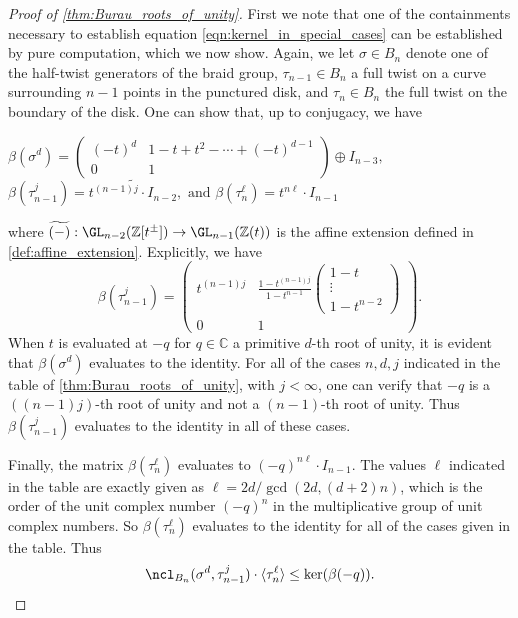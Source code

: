 \documentclass{amsart}
\begin{document}
    \begin{proof}[Proof of \cref{thm:Burau_roots_of_unity}]
        First we note that one of the containments necessary to establish equation \eqref{eqn:kernel_in_special_cases} can be established by pure computation, which we now show. Again, we let $\sigma \in B_n$ denote one of the half-twist generators of the braid group, $\tau_{n-1} \in B_n$ a full twist on a curve surrounding $n-1$ points in the punctured disk, and $\tau_n \in B_n$ the full twist on the boundary of the disk. One can show that, up to conjugacy, we have
        \begin{center}
            $\beta(\sigma^d) = \begin{pmatrix}
                (-t)^d & 1-t+t^2-\dotsb + (-t)^{d-1} \\ 0 & 1
            \end{pmatrix} \oplus I_{n-3},$ \\
            $\beta(\tau_{n-1}^j) = \widetilde{t^{(n-1)j} \cdot I_{n-2}}, \text{ and } 
            \beta(\tau_n^\ell) = t^{n\ell} \cdot I_{n-1}$
        \end{center}
        where $\widetilde{(-)}:\GL_{n-2}(\mathbb Z[t^\pm]) \to \GL_{n-1}(\mathbb Z(t))$ is the affine extension defined in \cref{def:affine_extension}. Explicitly, we have
        \begin{equation*}
            \beta(\tau_{n-1}^j) = \left( \begin{array}{c|c}
                 t^{(n-1)j} & \frac{1-t^{(n-1)j}}{1-t^{n-1}} \begin{pmatrix} 1-t \\ \vdots \\ 1-t^{n-2} \end{pmatrix}  \\ \hline
                 0 & 1 
            \end{array} \right).
        \end{equation*}
        When $t$ is evaluated at $-q$ for $q \in \mathbb C$ a primitive $d$-th root of unity, it is evident that $\beta(\sigma^d)$ evaluates to the identity. For all of the cases $n,d,j$ indicated in the table of \cref{thm:Burau_roots_of_unity}, with $j < \infty$, one can verify that $-q$ is a $((n-1)j)$-th root of unity and not a $(n-1)$-th root of unity. Thus $\beta(\tau_{n-1}^j)$ evaluates to the identity in all of these cases.
        
        Finally, the matrix $\beta(\tau_n^\ell)$ evaluates to $(-q)^{n\ell} \cdot I_{n-1}$. The values $\ell$ indicated in the table are exactly given as $\ell = 2d/\gcd(2d,(d+2)n)$, which is the order of the unit complex number $(-q)^n$ in the multiplicative group of unit complex numbers. So $\beta(\tau_n^\ell)$ evaluates to the identity for all of the cases given in the table. Thus
        \begin{equation*}
            \ncl_{B_n}(\sigma^d,\tau_{n-1}^j) \cdot \langle \tau_n^\ell \rangle \leq \ker(\beta(-q)).
        \end{equation*}


\end{proof}
\end{document}
